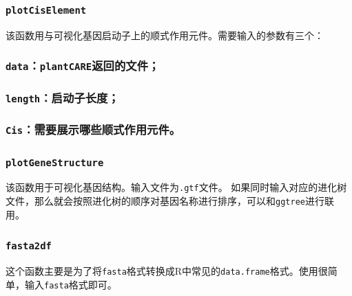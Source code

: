 \documentclass[
  10pt,
]{book}
\begin{document}
\hypertarget{plotciselement}{%
\subsubsection{\texorpdfstring{\texttt{plotCisElement}}{plotCisElement}}\label{plotciselement}}

该函数用与可视化基因启动子上的顺式作用元件。需要输入的参数有三个：

\hypertarget{dataplantcareux8fd4ux56deux7684ux6587ux4ef6}{%
\subsubsection{\texorpdfstring{\texttt{data}：\texttt{plantCARE}返回的文件；}{data：plantCARE返回的文件；}}\label{dataplantcareux8fd4ux56deux7684ux6587ux4ef6}}

\hypertarget{lengthux542fux52a8ux5b50ux957fux5ea6}{%
\subsubsection{\texorpdfstring{\texttt{length}：启动子长度；}{length：启动子长度；}}\label{lengthux542fux52a8ux5b50ux957fux5ea6}}

\hypertarget{cisux9700ux8981ux5c55ux793aux54eaux4e9bux987aux5f0fux4f5cux7528ux5143ux4ef6}{%
\subsubsection{\texorpdfstring{\texttt{Cis}：需要展示哪些顺式作用元件。}{Cis：需要展示哪些顺式作用元件。}}\label{cisux9700ux8981ux5c55ux793aux54eaux4e9bux987aux5f0fux4f5cux7528ux5143ux4ef6}}

\hypertarget{plotgenestructure}{%
\subsubsection{\texorpdfstring{\texttt{plotGeneStructure}}{plotGeneStructure}}\label{plotgenestructure}}

该函数用于可视化基因结构。输入文件为\texttt{.gtf}文件。
如果同时输入对应的进化树文件，那么就会按照进化树的顺序对基因名称进行排序，可以和\texttt{ggtree}进行联用。

\hypertarget{fasta2df}{%
\subsubsection{\texorpdfstring{\texttt{fasta2df}}{fasta2df}}\label{fasta2df}}

这个函数主要是为了将\texttt{fasta}格式转换成R中常见的\texttt{data.frame}格式。使用很简单，输入\texttt{fasta}格式即可。
\end{document}
